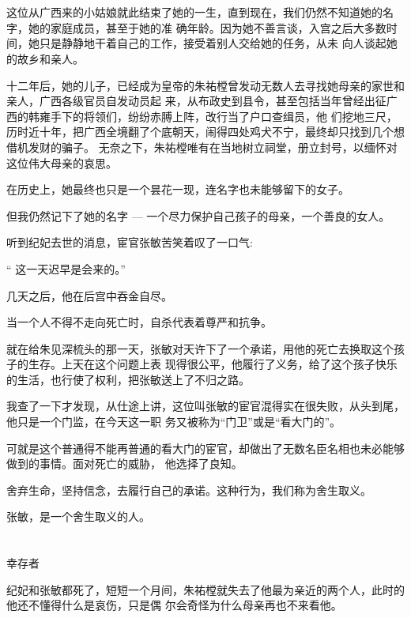 \documentclass[11pt,a4paper,onecolumn]{article}
\begin{document}
\section[\thesection]{}

这位从广西来的小姑娘就此结束了她的一生，直到现在，我们仍然不知道她的名字，她的家庭成员，甚至于她的准
确年龄。因为她不善言谈，入宫之后大多数时间，她只是静静地干着自己的工作，接受着别人交给她的任务，从未
向人谈起她的故乡和亲人。

十二年后，她的儿子，已经成为皇帝的朱祐樘曾发动无数人去寻找她母亲的家世和亲人，广西各级官员自发动员起
来，从布政史到县令，甚至包括当年曾经出征广西的韩雍手下的将领们，纷纷赤膊上阵，改行当了户口查缉员，他
们挖地三尺，历时近十年，把广西全境翻了个底朝天，闹得四处鸡犬不宁，最终却只找到几个想借机发财的骗子。
无奈之下，朱祐樘唯有在当地树立祠堂，册立封号，以缅怀对这位伟大母亲的哀思。

在历史上，她最终也只是一个昙花一现，连名字也未能够留下的女子。

但我仍然记下了她的名字 --- 一个尽力保护自己孩子的母亲，一个善良的女人。

听到纪妃去世的消息，宦官张敏苦笑着叹了一口气:

`` 这一天迟早是会来的。''

几天之后，他在后宫中吞金自尽。

当一个人不得不走向死亡时，自杀代表着尊严和抗争。

就在给朱见深梳头的那一天，张敏对天许下了一个承诺，用他的死亡去换取这个孩子的生存。上天在这个问题上表
现得很公平，他履行了义务，给了这个孩子快乐的生活，也行使了权利，把张敏送上了不归之路。

我查了一下才发现，从仕途上讲，这位叫张敏的宦官混得实在很失败，从头到尾，他只是一个门监，在今天这一职
务又被称为``门卫''或是``看大门的''。

可就是这个普通得不能再普通的看大门的宦官，却做出了无数名臣名相也未必能够做到的事情。面对死亡的威胁，
他选择了良知。

舍弃生命，坚持信念，去履行自己的承诺。这种行为，我们称为舍生取义。

张敏，是一个舍生取义的人。

\section[\thesection]{}

幸存者

纪妃和张敏都死了，短短一个月间，朱祐樘就失去了他最为亲近的两个人，此时的他还不懂得什么是哀伤，只是偶
尔会奇怪为什么母亲再也不来看他。
\end{document}
